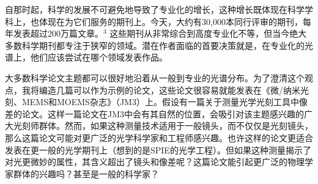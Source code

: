 自那时起，科学的发展不可避免地导致了专业化的增长，这种增长既体现在科学学科上，也体现在为它们服务的期刊上。今天，大约有30,000本同行评审的期刊，每年发表超过200万篇文章。${ }^{3}$ 这些期刊从非常综合到高度专业化不等，但当今绝大多数科学期刊都专注于狭窄的领域。潜在作者面临的首要决策就是，在专业化的光谱上，他们应该尝试在哪个领域发表作品。

大多数科学论文主题都可以很好地沿着从一般到专业的光谱分布。为了澄清这个观点，我将编造几篇可以作为示例的论文，这些论文很容易就能发表在《微/纳米光刻、MEMS和MOEMS杂志》（JM3）上。假设有一篇关于测量光学光刻工具中像差的论文。这样一篇论文在JM3中会有其自然的位置，会吸引对该主题感兴趣的广大光刻师群体。然而，如果这种测量技术适用于一般镜头，而不仅仅是光刻镜头，那么这篇论文可能对更广泛的光学科学家和工程师感兴趣。也许这样的论文更适合发表在更一般的光学期刊上（想到的是SPIE的光学工程）。但如果这种测量揭示了对光更微妙的属性，其含义超出了镜头和像差呢？这篇论文能引起更广泛的物理学家群体的兴趣吗？甚至是一般的科学家？


